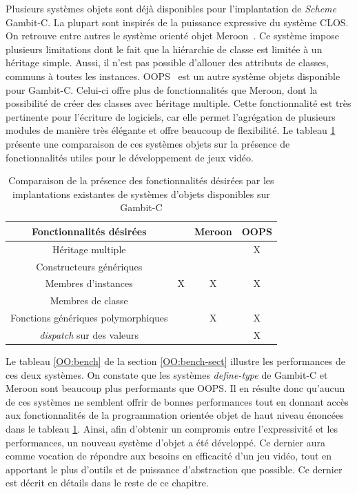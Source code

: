 \documentclass[12pt,twoside,letterpaper,francais]{book}
\newcommand{\Schemelang}{{\textit{Scheme }}}
\newcommand{\scheme}[1]{\selectlanguage{english}{\tt #1}\selectlanguage{french}}
\begin{document}
Plusieurs systèmes objets sont déjà disponibles pour l'implantation de
\Schemelang Gambit-C. La plupart sont inspirés de la puissance
expressive du système CLOS. On retrouve entre autres le système
orienté objet Meroon~\cite{MEROON}. Ce système impose plusieurs
limitations dont le fait que la hiérarchie de classe est limitée à un
héritage simple. Aussi, il n'est pas possible d'allouer des attributs
de classes, communs à toutes les instances. OOPS~\cite{OOPS} est un
autre système objets disponible pour Gambit-C. Celui-ci offre plus de
fonctionnalités que Meroon, dont la possibilité de créer des classes
avec héritage multiple. Cette fonctionnalité est très pertinente pour
l'écriture de logiciels, car elle permet l'agrégation de plusieurs
modules de manière très élégante et offre beaucoup de flexibilité. Le
tableau \ref{OO:fonct-comp} présente une comparaison de ces systèmes
objets sur la présence de fonctionnalités utiles pour le développement
de jeux vidéo.

\begin{table}
  \center
  \begin{tabular}{cccc}
    \hline
    Fonctionnalités désirées           & \scheme{define-type} & Meroon & OOPS\\
    \hline \hline
    Héritage multiple                   &                      &         & X\\
    Constructeurs génériques            &                      &         &  \\
    Membres d'instances                 & X                    & X       & X\\
    Membres de classe                   &                      &         &  \\
    Fonctions génériques polymorphiques &                      & X       & X\\
    \textit{dispatch} sur des valeurs   &                      &         & X\\
    \hline
  \end{tabular}
  \caption{Comparaison de la présence des fonctionnalités désirées par
    les implantations existantes de systèmes d'objets disponibles sur
    Gambit-C}
  \label{OO:fonct-comp}
\end{table}

Le tableau \ref{OO:bench} de la section \ref{OO:bench-sect} illustre
les performances de ces deux systèmes. On constate que les systèmes
\textit{define-type} de Gambit-C et Meroon sont beaucoup plus
performants que OOPS. Il en résulte donc qu'aucun de ces systèmes ne
semblent offrir de bonnes performances tout en donnant accès aux
fonctionnalités de la programmation orientée objet de haut niveau
énoncées dans le tableau \ref{OO:fonct-comp}. Ainsi, afin d'obtenir un
compromis entre l'expressivité et les performances, un nouveau système
d'objet a été développé. Ce dernier aura comme vocation de répondre
aux besoins en efficacité d'un jeu vidéo, tout en apportant le plus
d'outils et de puissance d'abstraction que possible. Ce dernier est
décrit en détails dans le reste de ce chapitre.
\end{document}
